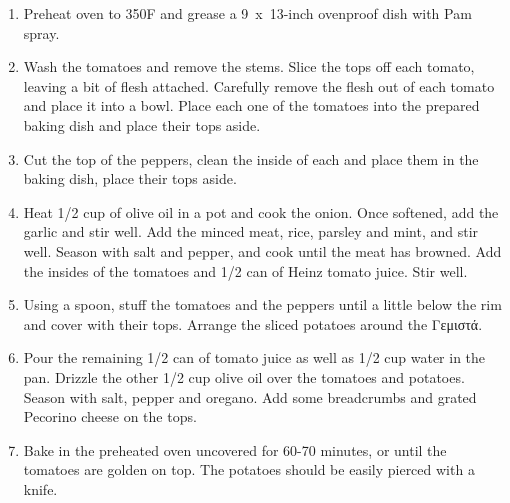 \begin{enumerate}
    \item Preheat oven to 350\degree F and grease a 9~x~13-inch ovenproof dish with Pam spray.
    \item Wash the tomatoes and remove the stems. Slice the tops off each tomato, leaving a bit of flesh attached. Carefully remove the flesh out of each tomato and place it into a bowl. Place each one of the tomatoes into the prepared baking dish and place their tops aside.
    \item Cut the top of the peppers, clean the inside of each and place them in the baking dish, place their tops aside.
    \item Heat 1/2 cup of olive oil in a pot and cook the onion. Once softened, add the garlic and stir well. Add the minced meat, rice, parsley and mint, and stir well. Season with salt and pepper, and cook until the meat has browned. Add the insides of the tomatoes and 1/2 can of Heinz tomato juice. Stir well.
    \item Using a spoon, stuff the tomatoes and the peppers until a little below the rim and cover with their tops. Arrange the sliced potatoes around the \textgreek{Γεμιστά}.
    \item Pour the remaining 1/2 can of tomato juice as well as 1/2 cup water in the pan. Drizzle the other 1/2 cup olive oil over the tomatoes and potatoes. Season with salt, pepper and oregano. Add some breadcrumbs and grated Pecorino cheese on the tops.
    \item Bake in the preheated oven uncovered for 60-70 minutes, or until the tomatoes are golden on top. The potatoes should be easily pierced with a knife.
\end{enumerate}
